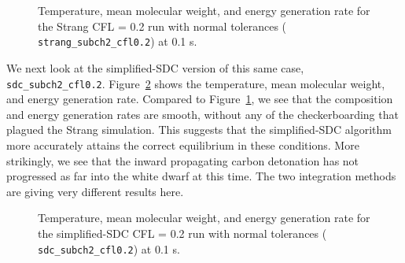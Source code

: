 \documentclass[linenumbers]{aastex631}
\newcommand{\isot}[2]{$^{#2}\mathrm{#1}$}
\newcommand{\MarginPar}[1]{\marginpar{\vskip-\baselineskip\raggedright\tiny\sffamily\hrule\smallskip{\color{red}#1}\par\smallskip\hrule}}
\begin{document}
\begin{figure}
\centering
{}
\caption{\label{fig:subch_strang_cfl02} Temperature, mean molecular weight, and
energy generation rate for the Strang CFL = 0.2 run with normal tolerances ({\tt
strang\_subch2\_cfl0.2}) at 0.1 s.}
\end{figure}

We next look at the simplified-SDC version of this same case, {\tt
sdc\_subch2\_cfl0.2}.  Figure~\ref{fig:subch_sdc_cfl02} shows the temperature,
mean molecular weight, and energy generation rate. Compared to
Figure~\ref{fig:subch_strang_cfl02}, we see that the composition and energy
generation rates are smooth, without any of the checkerboarding that plagued the
Strang simulation.  This suggests that the simplified-SDC algorithm more accurately
attains the correct equilibrium in these conditions. More
strikingly, we see that the inward propagating carbon detonation has not
progressed as far into the white dwarf at this time.  The two integration
methods are giving very different results here.

\begin{figure}
\centering
{}
\caption{\label{fig:subch_sdc_cfl02} Temperature, mean molecular weight, and
energy generation rate for the simplified-SDC CFL = 0.2 run with normal tolerances ({\tt
sdc\_subch2\_cfl0.2}) at 0.1 s.}
\end{figure}


\end{document}
